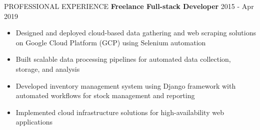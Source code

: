 \documentclass{resume} %
\begin{document}
\begin{rSection}{PROFESSIONAL EXPERIENCE}
{\textbf{Freelance Full-stack Developer}}   \hfill {2015 - Apr 2019}
\begin{itemize}
    \item Designed and deployed cloud-based data gathering and web scraping solutions on Google Cloud Platform (GCP) using Selenium automation
    \item Built scalable data processing pipelines for automated data collection, storage, and analysis
    \item Developed inventory management system using Django framework with automated workflows for stock management and reporting
    \item Implemented cloud infrastructure solutions for high-availability web applications
\end{itemize}

\end{rSection}
\end{document}
